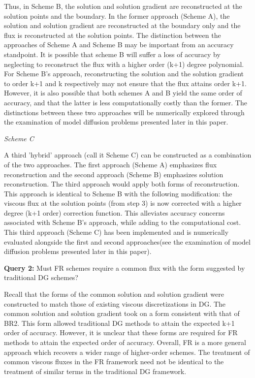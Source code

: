 \vspace{0.1 in}

\noindent Thus, in Scheme B, the solution and solution gradient are reconstructed at the solution points and the boundary. In the former approach (Scheme A), the solution and solution gradient are reconstructed at the boundary only and the flux is reconstructed at the solution points. The distinction between the approaches of Scheme A and Scheme B may be important from an accuracy standpoint. It is possible that scheme B will suffer a loss of accuracy by neglecting to reconstruct the flux with a higher order (k+1) degree polynomial. For Scheme B's approach, reconstructing the solution and the solution gradient to order k+1 and k respectively may not ensure that the flux attains order k+1. However, it is also possible that both schemes A and B yield the same order of accuracy, and that the latter is less computationally costly than the former. The distinctions between these two approaches will be numerically explored through the examination of model diffusion problems presented later in this paper.

\vspace{0.1 in}
\noindent \emph{Scheme C}
\vspace{0.1 in}

\noindent A third 'hybrid' approach (call it Scheme C) can be constructed as a combination of the two approaches. The first approach (Scheme A) emphasizes flux reconstruction and the second approach (Scheme B) emphasizes solution reconstruction. The third approach would apply both forms of reconstruction. This approach is identical to Scheme B with the following modification: the viscous flux at the solution points (from step 3) is now corrected with a higher degree (k+1 order) correction function. This alleviates accuracy concerns associated with Scheme B's approach, while adding to the computational cost. This third approach (Scheme C) has been implemented and is numerically evaluated alongside the first and second approaches(see the examination of model diffusion problems presented later in this paper).


\vspace{0.2 in}
\begin{raggedleft}
{\bf Query 2:} Must FR schemes require a common flux with the form suggested by traditional DG schemes?
\end{raggedleft}
\vspace{0.2 in}

Recall that the forms of the common solution and solution gradient were constructed to match those of existing viscous discretizations in DG. The common solution and solution gradient took on a form consistent with that of BR2. This form allowed traditional DG methods to attain the expected k+1 order of accuracy. However, it is unclear that these forms are required for FR methods to attain the expected order of accuracy. Overall, FR is a more general approach which recovers a wider range of higher-order schemes. The treatment of common viscous fluxes in the FR framework need not be identical to the treatment of similar terms in the traditional DG framework.

